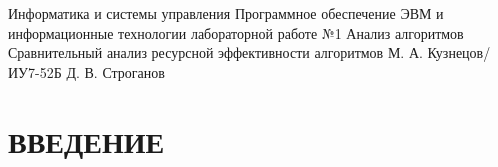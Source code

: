 \documentclass{bmstu}
\begin{document}
\makereporttitle
{Информатика и системы управления}
{Программное обеспечение ЭВМ и информационные технологии}
{лабораторной работе №1}
{Анализ алгоритмов}
{Сравнительный анализ ресурсной эффективности алгоритмов}
{} %
{М. А. Кузнецов/ИУ7-52Б} %
{Д. В. Строганов}

\maketableofcontents

\chapter*{ВВЕДЕНИЕ}


\end{document}
